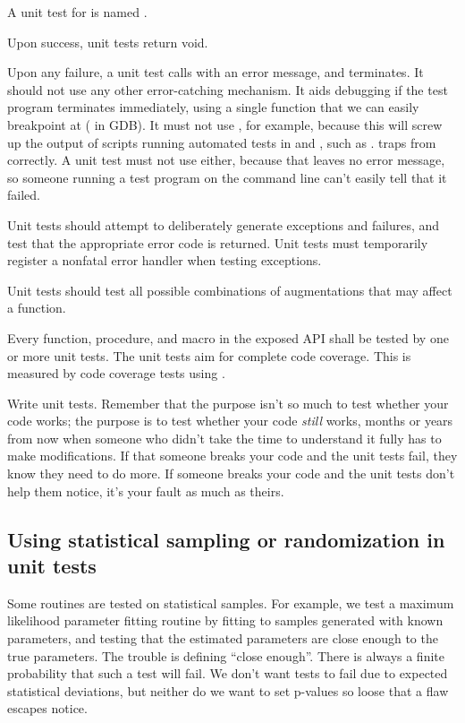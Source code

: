 A unit test for  is named . 

Upon success, unit tests return void.

Upon any failure, a unit test calls  with an error
message, and terminates. It should not use any other error-catching
mechanism. It aids debugging if the test program terminates
immediately, using a single function that we can easily breakpoint at
( in GDB). It must not use ,
for example, because this will screw up the output of scripts running
automated tests in  and , such as
.  traps  from
 correctly. A unit test must not use
 either, because that leaves no error message, so
someone running a test program on the command line can't easily tell
that it failed.

Unit tests should attempt to deliberately generate exceptions and
failures, and test that the appropriate error code is returned.  Unit
tests must temporarily register a nonfatal error handler when testing
exceptions. 

Unit tests should test all possible combinations of augmentations that
may affect a function.

Every function, procedure, and macro in the exposed API shall be
tested by one or more unit tests. The unit tests aim for complete code
coverage. This is measured by code coverage tests using .

Write unit tests. Remember that the purpose isn't so much to test
whether your code works; the purpose is to test whether your code
\emph{still} works, months or years from now when someone who didn't
take the time to understand it fully has to make modifications. If
that someone breaks your code and the unit tests fail, they know they
need to do more. If someone breaks your code and the unit tests don't
help them notice, it's your fault as much as theirs.


\subsection{Using statistical sampling or randomization in unit tests}

Some routines are tested on statistical samples. For example, we test
a maximum likelihood parameter fitting routine by fitting to samples
generated with known parameters, and testing that the estimated
parameters are close enough to the true parameters.  The trouble is
defining ``close enough''. There is always a finite probability that
such a test will fail. We don't want tests to fail due to expected
statistical deviations, but neither do we want to set p-values so
loose that a flaw escapes notice.

